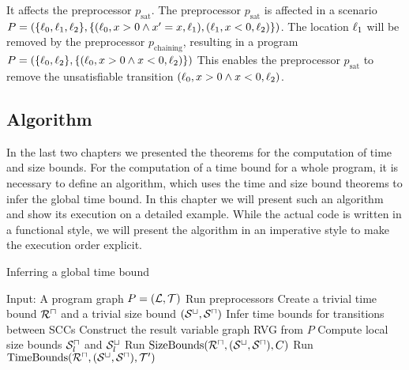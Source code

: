 It affects the preprocessor $p_{\text{sat}}$.
The preprocessor $p_{\text{sat}}$ is affected in a scenario $P = (\lbrace \ell_0, \ell_1, \ell_2 \rbrace, \lbrace (\ell_0,x>0 \wedge x'=x,\ell_1), (\ell_1,x<0,\ell_2) \rbrace)$.
The location $\ell_1$ will be removed by the preprocessor $p_{\text{chaining}}$, resulting in a program $P = (\lbrace \ell_0, \ell_2 \rbrace, \lbrace (\ell_0,x>0 \wedge x<0,\ell_2) \rbrace)$
This enables the preprocessor $p_{\text{sat}}$ to remove the unsatisfiable transition $(\ell_0,x>0 \wedge x<0,\ell_2)$.


\subsection{Algorithm}

In the last two chapters we presented the theorems for the computation of time and size bounds.
For the computation of a time bound for a whole program, it is necessary to define an algorithm, which uses the time and size bound theorems to infer the global time bound.
In this chapter we will present such an algorithm and show its execution on a detailed example.
While the actual code is written in a functional style, we will present the algorithm in an imperative style to make the execution order explicit.

\begin{algorithm}
\caption{Inferring a global time bound}\label{complete_algorithm}
\begin{algorithmic}[1]
  \State Input: A program graph $P = (\mathcal{L}, \mathcal{T})$
  \State Run preprocessors
  \State Create a trivial time bound ${\mathcal{R}^\sqcap}$ and a trivial size bound ${({\mathcal{S}^\sqcup}, {\mathcal{S}^\sqcap})}$
  \State Infer time bounds for transitions between SCCs
  \State Construct the result variable graph RVG from $P$
  \State Compute local size bounds ${\mathcal{S}^\sqcap_l}$ and ${\mathcal{S}^\sqcup_l}$
  \Repeat
      \State Run $\text{SizeBounds}({\mathcal{R}^\sqcap}, {({\mathcal{S}^\sqcup}, {\mathcal{S}^\sqcap})}, C)$
    \EndFor
      \State Run $\text{TimeBounds}({\mathcal{R}^\sqcap}, {({\mathcal{S}^\sqcup}, {\mathcal{S}^\sqcap})}, \mathcal{T}')$
    \EndFor
\end{algorithmic}
\end{algorithm}
